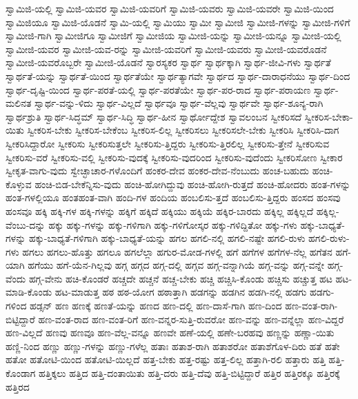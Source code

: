 {ಸ್ವಾಮಿಜಿ-ಯಲ್ಲಿ
ಸ್ವಾಮಿಜಿ-ಯವರ
ಸ್ವಾಮಿಜಿ-ಯವರಿಗೆ
ಸ್ವಾಮಿಜಿ-ಯವರು
ಸ್ವಾಮಿಜಿ-ಯವರೇ
ಸ್ವಾಮಿಜಿ-ಯಿಂದ
ಸ್ವಾಮಿಜಿಯೂ
ಸ್ವಾಮಿಜಿ-ಯೊಡನೆ
ಸ್ವಾಮಿ-ಯಲ್ಲಿ
ಸ್ವಾಮಿಯು
ಸ್ವಾಮೀ
ಸ್ವಾಮೀಜಿ
ಸ್ವಾಮೀಜಿ-ಗಳನ್ನು
ಸ್ವಾಮೀಜಿ-ಗಳಿಗೆ
ಸ್ವಾಮೀಜಿ-ಗಾಗಿ
ಸ್ವಾಮೀಜಿಗೂ
ಸ್ವಾಮೀಜಿಗೆ
ಸ್ವಾಮೀಜಿಯ
ಸ್ವಾಮೀಜಿ-ಯನ್ನು
ಸ್ವಾಮೀಜಿ-ಯನ್ನೂ
ಸ್ವಾಮೀಜಿ-ಯಲ್ಲಿ
ಸ್ವಾಮೀಜಿ-ಯವರ
ಸ್ವಾಮೀಜಿ-ಯವ-ರನ್ನು
ಸ್ವಾಮೀಜಿ-ಯವರಿಗೆ
ಸ್ವಾಮೀಜಿ-ಯವರು
ಸ್ವಾಮೀಜಿ-ಯವರೊಡನೆ
ಸ್ವಾಮೀಜಿ-ಯವರೊಬ್ಬರೇ
ಸ್ವಾಮೀಜಿ-ಯೊಡನೆ
ಸ್ವಾರಸ್ಯಕರ
ಸ್ವಾರ್ಥ
ಸ್ವಾರ್ಥಕ್ಕಾಗಿ
ಸ್ವಾರ್ಥ-ಜೀವಿ-ಗಳು
ಸ್ವಾರ್ಥತೆ
ಸ್ವಾರ್ಥತೆ-ಯನ್ನು
ಸ್ವಾರ್ಥತೆ-ಯಿಂದ
ಸ್ವಾರ್ಥತೆಯೇ
ಸ್ವಾರ್ಥತ್ಯಾಗವೇ
ಸ್ವಾರ್ಥದ
ಸ್ವಾರ್ಥ-ದಾರಾಧನೆಯು
ಸ್ವಾರ್ಥ-ದಿಂದ
ಸ್ವಾರ್ಥ-ದೃಷ್ಟಿ-ಯಿಂದ
ಸ್ವಾರ್ಥ-ಪರತೆ-ಯಲ್ಲಿ
ಸ್ವಾರ್ಥ-ಪರತೆಯೇ
ಸ್ವಾರ್ಥ-ಪರ-ರಾದ
ಸ್ವಾರ್ಥ-ಪರಾಯಣ
ಸ್ವಾರ್ಥ-ಮಲಿನತ
ಸ್ವಾರ್ಥ-ವನ್ನು-ಳಿದು
ಸ್ವಾರ್ಥ-ವಿಲ್ಲದೆ
ಸ್ವಾರ್ಥವೂ
ಸ್ವಾರ್ಥ-ವೆಲ್ಲವು
ಸ್ವಾರ್ಥವೇ
ಸ್ವಾರ್ಥ-ಶೂನ್ಯ-ರಾಗಿ
ಸ್ವಾರ್ಥಶ್ರುತಿ
ಸ್ವಾರ್ಥ-ಸಿದ್ಧಮ್
ಸ್ವಾರ್ಥ-ಸಿದ್ಧಿ
ಸ್ವಾರ್ಥ-ಹೀನ
ಸ್ವಾರ್ಥೋದ್ದೇಶ
ಸ್ವಾವಲಂಬನ
ಸ್ವೀಕರಿಸದೆ
ಸ್ವೀಕರಿಸ-ಬೇಕಾ-ಯಿತು
ಸ್ವೀಕರಿಸ-ಬೇಕು
ಸ್ವೀಕರಿಸ-ಬೇಕೆಂಬ
ಸ್ವೀಕರಿಸ-ಲಿಲ್ಲ
ಸ್ವೀಕರಿಸಲು
ಸ್ವೀಕರಿಸಲೇ-ಬೇಕು
ಸ್ವೀಕರಿಸಿ
ಸ್ವೀಕರಿಸಿ-ದಾಗ
ಸ್ವೀಕರಿಸಿದ್ದಾರೋ
ಸ್ವೀಕರಿಸು
ಸ್ವೀಕರಿಸುತ್ತಲೇ
ಸ್ವೀಕರಿಸು-ತ್ತಿದ್ದರು
ಸ್ವೀಕರಿಸು-ತ್ತಿರಲಿಲ್ಲ
ಸ್ವೀಕರಿಸು-ತ್ತೇನೆ
ಸ್ವೀಕರಿಸುವ
ಸ್ವೀಕರಿಸು-ವರೆ
ಸ್ವೀಕರಿಸು-ವಲ್ಲಿ
ಸ್ವೀಕರಿಸು-ವುದಕ್ಕೆ
ಸ್ವೀಕರಿಸು-ವುದರಿಂದ
ಸ್ವೀಕರಿಸು-ವುದೆಂದು
ಸ್ವೀಕರಿಸೋಣ
ಸ್ವೀಕಾರ
ಸ್ವೀಕೃತ-ವಾಗು-ವುದು
ಸ್ವೇಚ್ಛಾಚಾರ-ಗಳೊಂದಿಗೆ
ಹಂಕರ-ದೇವ
ಹಂಕರ-ದೇವ-ನೆಂಬುದು
ಹಂಚ-ಬಹುದು
ಹಂಚಿ-ಕೊಳ್ಳುವ
ಹಂಚಿ-ಬಿಡ-ಬೇಕೆನ್ನಿಸು-ವುದು
ಹಂಚಿ-ಹೋಗಿದ್ದುವು
ಹಂಚಿ-ಹೋಗಿ-ರುತ್ತದೆ
ಹಂಚಿ-ಹೋದರು
ಹಂತ-ಗಳನ್ನು
ಹಂತ-ಗಳಲ್ಲಿಯೂ
ಹಂತಹಂತ-ವಾಗಿ
ಹಂದಿ-ಗಳ
ಹಂದಿಯ
ಹಂಬಲಿಸು-ತ್ತದೆ
ಹಂಬಲಿಸು-ತ್ತಿದ್ದರು
ಹಂಸದ
ಹಂಸವು
ಹಂಸವೂ
ಹಕ್ಕಿ
ಹಕ್ಕಿ-ಗಳ
ಹಕ್ಕಿ-ಗಳನ್ನು
ಹಕ್ಕಿಗೆ
ಹಕ್ಕಿದೆ
ಹಕ್ಕಿಯು
ಹಕ್ಕಿಯೆ
ಹಕ್ಕಿರ-ಬಾರದು
ಹಕ್ಕಿಲ್ಲ
ಹಕ್ಕಿಲ್ಲದೆ
ಹಕ್ಕಿಲ್ಲ-ವೆಂಬು-ದನ್ನು
ಹಕ್ಕು
ಹಕ್ಕು-ಗಳನ್ನು
ಹಕ್ಕು-ಗಳಿಗಾಗಿ
ಹಕ್ಕು-ಗಳಿಗೋಸ್ಕರ
ಹಕ್ಕು-ಗಳಿದ್ದಿತೋ
ಹಕ್ಕು-ಗಳು
ಹಕ್ಕು-ಬಾಧ್ಯತೆ-ಗಳನ್ನು
ಹಕ್ಕು-ಬಾಧ್ಯತೆ-ಗಳಿಗಾಗಿ
ಹಕ್ಕು-ಬಾಧ್ಯತೆ-ಯನ್ನು
ಹಗಲ
ಹಗಲಿ-ನಲ್ಲಿ
ಹಗಲಿ-ನಷ್ಟೇ
ಹಗಲಿ-ರುಳು
ಹಗಲಿ-ರುಳು-ಗಳು
ಹಗಲು
ಹಗಲು-ಹೊತ್ತು
ಹಗಲೂ
ಹಗಲೆಲ್ಲಾ
ಹಗುರ-ಮೋಡ-ಗಳಲ್ಲಿ
ಹಗೆ
ಹಗೆಗಳ
ಹಗೆಗಳ-ನೆಲ್ಲ
ಹಗೆತನ
ಹಗೆ-ಯಾಗಿ
ಹಗೆಯು
ಹಗೆ-ಯೆನ-ಗಿಲ್ಲವು
ಹಗ್ಗ
ಹಗ್ಗದ
ಹಗ್ಗ-ದಲ್ಲಿ
ಹಗ್ಗವ
ಹಗ್ಗ-ವನ್ನಾಗಿಯೆ
ಹಗ್ಗ-ವನ್ನು
ಹಗ್ಗ-ವನ್ನೇ
ಹಗ್ಗ-ವೆಂದು
ಹಗ್ಗ-ವೇನು
ಹಚಿ-ಕೊಂಡರೆ
ಹಚ್ಚದೇ
ಹಚ್ಚನೆ
ಹಚ್ಚ-ಬೇಕು
ಹಚ್ಚಿ
ಹಚ್ಚಿಸಿ-ಕೊಂಡು
ಹಚ್ಚಿಸು
ಹಚ್ಚುತ್ತ
ಹಟ
ಹಟ-ಮಾಡಿ-ಕೊಂಡು
ಹಟ-ಮಾಡುತ್ತ
ಹಠ
ಹಠ-ಯೋಗ
ಹಠಾತ್ತಾಗಿ
ಹಡಗನ್ನು
ಹಡಗಿನ
ಹಡಗಿ-ನಲ್ಲಿ
ಹಡಗು
ಹಡಗು-ಗಳಿಂದ
ಹಡ್ಸನ್
ಹಣ
ಹಣಕ್ಕೆ
ಹಣತೆ-ಯನ್ನು
ಹಣದ
ಹಣ-ದಲ್ಲಿ
ಹಣ-ದಾಸೆ-ಗಾಗಿ
ಹಣ-ದಿಂದ
ಹಣ-ವಂತ-ರಾಗಿ-ಬಿಟ್ಟಿದ್ದಾರೆ
ಹಣ-ವಂತ-ರಾದ
ಹಣ-ವಂತ-ರಿಗೆ
ಹಣ-ವನ್ನರ-ಸುತ್ತಿ-ರುವರೋ
ಹಣ-ವನ್ನು
ಹಣ-ವನ್ನೆಲ್ಲಾ
ಹಣ-ವಿದ್ದರೆ
ಹಣ-ವಿಲ್ಲದೆ
ಹಣವು
ಹಣವೂ
ಹಣ-ವೆಲ್ಲ-ವನ್ನೂ
ಹಣವೇ
ಹಣೆ-ಯಲ್ಲಿ
ಹಣೇ-ಬರಹವು
ಹಣ್ಣನ್ನು
ಹಣ್ಣಾ-ಯಿತು
ಹಣ್ಣಿ-ನಿಂದ
ಹಣ್ಣು
ಹಣ್ಣು-ಗಳನ್ನು
ಹಣ್ಣು-ಗಳೆಲ್ಲ
ಹತಾಃ
ಹತಾಶ-ರಾಗಿ
ಹತಾಶರೋ
ಹತಾಶೆಗೊಳ-ದಿರು
ಹತೆ
ಹತೇ
ಹತೋ
ಹತೋಟಿ-ಯಿಂದ
ಹತೋಟಿ-ಯಿಲ್ಲದೆ
ಹತ್ತ-ಬೇಕು
ಹತ್ತ-ರಷ್ಟು
ಹತ್ತ-ಲಿಲ್ಲ
ಹತ್ತಾಗಿ-ರಲಿ
ಹತ್ತಾರು
ಹತ್ತಿ
ಹತ್ತಿ-ಕೊಂಡಾಗ
ಹತ್ತಿಕ್ಕಲು
ಹತ್ತಿದ
ಹತ್ತಿ-ದಂತಾಯಿತು
ಹತ್ತಿ-ದರು
ಹತ್ತಿ-ದೆವು
ಹತ್ತಿ-ಬಿಟ್ಟಿದ್ದಾರೆ
ಹತ್ತಿರ
ಹತ್ತಿರಕ್ಕೂ
ಹತ್ತಿರಕ್ಕೆ
ಹತ್ತಿರದ
}
